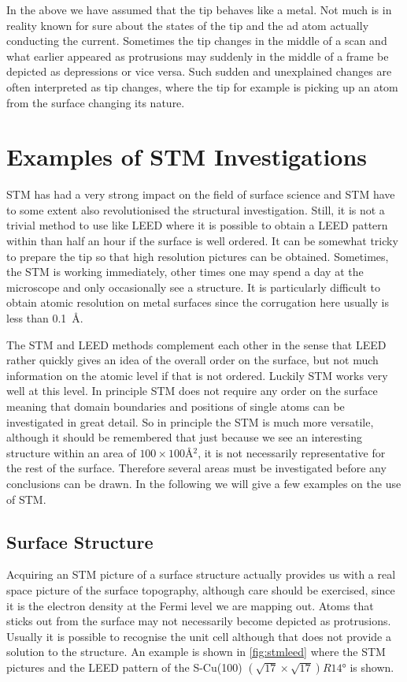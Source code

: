 In the above we have assumed that the tip behaves like a metal. Not much is in reality known for sure about the states of the tip and the ad atom actually conducting the current. Sometimes the tip changes in the middle of a scan and what earlier appeared as protrusions may suddenly in the middle of a frame be  depicted as depressions or vice versa. Such sudden and unexplained changes are often interpreted as tip changes, where the tip for example is picking up an atom  from the surface changing its nature.

\section{Examples of STM Investigations}
STM has had a very strong impact on the field of surface science and STM have to some extent also revolutionised the structural investigation. Still, it is not a trivial method to use like LEED where it is possible to obtain a LEED pattern within than half an hour if the surface is well ordered. It can be somewhat tricky to prepare the tip so that high resolution pictures can be  obtained. Sometimes, the STM  is working immediately, other times one may spend a day at the microscope and only occasionally see a structure. It is particularly difficult to obtain atomic resolution on metal surfaces since the corrugation here usually is less than \SI{0.1}{\angstrom}.

The STM and LEED methods complement each other in the sense that LEED rather quickly gives an idea of the overall order on the surface, but not much information on the atomic level if that is not ordered. Luckily STM works very well at this level. In principle STM does not require any order on the surface meaning that domain boundaries and positions of single atoms can be investigated in great detail. So in principle the STM is much more versatile, although it should be remembered that just because we see an interesting structure within an area of $100\times 100 \si{\angstrom^2}$, it is not necessarily representative for the rest of the surface. Therefore several areas must  be investigated before any conclusions can be drawn. In the following we will give a few examples on the use of STM.

\subsection{Surface Structure}
Acquiring an STM picture of a surface structure actually provides us with a real space picture of the surface topography, although care should be exercised, since it is the electron density at the Fermi level we are mapping out. Atoms that sticks out from the surface may  not necessarily become depicted as protrusions. Usually it is possible to recognise the unit cell although that does not provide a solution to the structure. An example is shown in \autoref{fig:stmleed} where the STM pictures and the LEED pattern of the S-Cu(100) $(\sqrt{17}\times\sqrt{17})R\ang{14}$ is shown.

